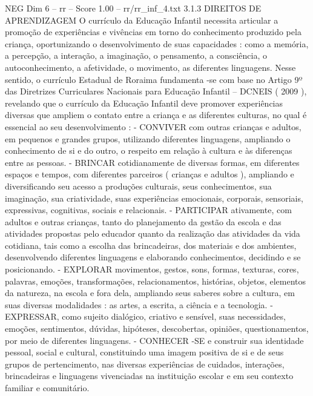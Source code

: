 \begin{textsample}{NEG Dim 6 – rr – Score 1.00 – rr/rr\_inf\_4.txt}  \label{ex:f6_neg_073}
3.1.3 DIREITOS DE APRENDIZAGEM O currículo da Educação Infantil necessita articular a promoção de experiências e vivências em torno do conhecimento produzido pela criança, oportunizando o desenvolvimento de suas capacidades : como a memória, a percepção, a interação, a imaginação, o pensamento, a consciência, o autoconhecimento, a afetividade, o movimento, as diferentes linguagens.
Nesse sentido, o currículo Estadual de Roraima fundamenta -se com base no Artigo 9º das Diretrizes Curriculares Nacionais para Educação Infantil – DCNEIS ( 2009 ), revelando que o currículo da Educação Infantil deve promover experiências diversas que ampliem o contato entre a criança e as diferentes culturas, no qual é essencial ao seu desenvolvimento : - CONVIVER com outras crianças e adultos, em pequenos e grandes grupos, utilizando diferentes linguagens, ampliando o conhecimento de si e do outro, o respeito em relação à cultura e às diferenças entre as pessoas. - BRINCAR cotidianamente de diversas formas, em diferentes espaços e tempos, com diferentes parceiros ( crianças e adultos ), ampliando e diversificando seu acesso a produções culturais, seus conhecimentos, sua imaginação, sua criatividade, suas experiências emocionais, corporais, sensoriais, expressivas, cognitivas, sociais e relacionais. - PARTICIPAR ativamente, com adultos e outras crianças, tanto do planejamento da gestão da escola e das atividades propostas pelo educador quanto da realização das atividades da vida cotidiana, tais como a escolha das brincadeiras, dos materiais e dos ambientes, desenvolvendo diferentes linguagens e elaborando conhecimentos, decidindo e se posicionando. - EXPLORAR movimentos, gestos, sons, formas, texturas, cores, palavras, emoções, transformações, relacionamentos, histórias, objetos, elementos da natureza, na escola e fora dela, ampliando seus saberes sobre a cultura, em suas diversas modalidades : as artes, a escrita, a ciência e a tecnologia. - EXPRESSAR, como sujeito dialógico, criativo e sensível, suas necessidades, emoções, sentimentos, dúvidas, hipóteses, descobertas, opiniões, questionamentos, por meio de diferentes linguagens. - CONHECER -SE e construir sua identidade pessoal, social e cultural, constituindo uma imagem positiva de si e de seus grupos de pertencimento, nas diversas experiências de cuidados, interações, brincadeiras e linguagens vivenciadas na instituição escolar e em seu contexto familiar e comunitário.

\end{textsample}
